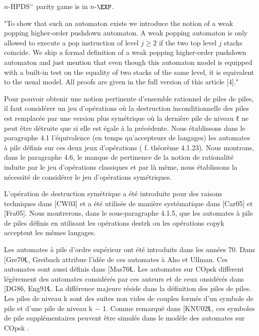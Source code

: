 \documentclass[a4paper,UKenglish,cleveref, autoref, thm-restate]{lipics-v2021}
\begin{document}

\begin{theorem}\label{HPDA parity game}
{\sc $n$-HPDS$^=$ parity game} is in $n$-$\EXP$.
\end{theorem}





\iffalse
"To show that such an automaton exists we introduce the notion of a weak
popping higher-order pushdown automaton. A weak popping automaton is only
allowed to execute a pop instruction of level $j \geq 2$ if the two top level $j$ stacks
coincide. We skip a formal definition of a weak popping higher-order pushdown
automaton and just mention that even though this automaton model is equipped
with a built-in test on the equality of two stacks of the same level, it is equivalent
to the usual model. All proofs are given in the full version of this article [4]."

Pour pouvoir obtenir une notion pertinente d'ensemble rationnel de piles de
piles, il faut considérer un jeu d'opérations où la destruction inconditionnelle des
piles est remplacée par une version plus symétrique où la dernière pile de niveau ℓ
ne peut être détruite que si elle est égale à la précédente. Nous établissons dans le
paragraphe 4.1 l'équivalence (en temps qu'accepteurs de langages) les automates
à pile définis sur ces deux jeux d'opérations ( f. théorème 4.1.23). Nous montrons,
dans le paragraphe 4.6, le manque de pertinence de la notion de rationalité induite
par le jeu d'opérations classiques et par là même, nous établissons la nécessité de
considérer le jeu d'opérations symétriques.

L'opération de destruction symétrique a été introduite pour des raisons techniques dans 
[CW03] et a été utilisée de manière 
systématique dans [Car05] et
[Fra05]. 
Nous montrerons, dans le sous-paragraphe 4.1.5, que les automates à pile
de piles définis en utilisant les opérations destrk ou les opérations copyk acceptent
les mêmes langages.

Les automates à pile d'ordre supérieur ont été introduits dans les années 70.
Dans [Gre70℄, Greibach attribue l'idée de ces automates à Aho et Ullman. Ces
automates sont aussi définis dans [Mas76℄. Les automates sur COpsk diffèrent
légèrement des automates considérés par ces auteurs et de ceux onsidérés dans
[DG86, Eng91℄. La différence majeure réside dans la définition des piles de piles.
Les piles de niveau k sont des suites non vides de couples formés d'un symbole de
pile et d'une pile de niveau k − 1. Comme remarqué dans [KNU02℄, ces symboles
de pile supplémentaires peuvent être simulés dans le modèle des automates sur
COpsk .
\end{document}
